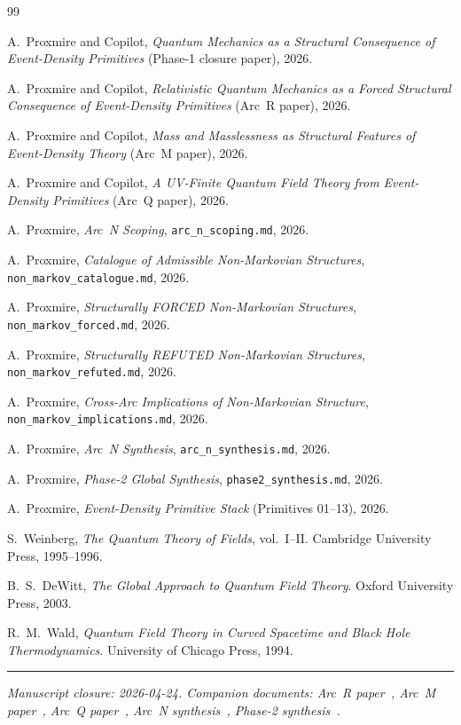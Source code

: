 \documentclass[11pt,a4paper]{article}
\begin{document}
\begin{thebibliography}{99}

A.~Proxmire and Copilot, \emph{Quantum Mechanics as a Structural Consequence of Event-Density Primitives} (Phase-1 closure paper), 2026.

A.~Proxmire and Copilot, \emph{Relativistic Quantum Mechanics as a Forced Structural Consequence of Event-Density Primitives} (Arc~R paper), 2026.

A.~Proxmire and Copilot, \emph{Mass and Masslessness as Structural Features of Event-Density Theory} (Arc~M paper), 2026.

A.~Proxmire and Copilot, \emph{A UV-Finite Quantum Field Theory from Event-Density Primitives} (Arc~Q paper), 2026.

A.~Proxmire, \emph{Arc~N Scoping}, \texttt{arc\_n\_scoping.md}, 2026.

A.~Proxmire, \emph{Catalogue of Admissible Non-Markovian Structures}, \texttt{non\_markov\_catalogue.md}, 2026.

A.~Proxmire, \emph{Structurally FORCED Non-Markovian Structures}, \texttt{non\_markov\_forced.md}, 2026.

A.~Proxmire, \emph{Structurally REFUTED Non-Markovian Structures}, \texttt{non\_markov\_refuted.md}, 2026.

A.~Proxmire, \emph{Cross-Arc Implications of Non-Markovian Structure}, \texttt{non\_markov\_implications.md}, 2026.

A.~Proxmire, \emph{Arc~N Synthesis}, \texttt{arc\_n\_synthesis.md}, 2026.

A.~Proxmire, \emph{Phase-2 Global Synthesis}, \texttt{phase2\_synthesis.md}, 2026.

A.~Proxmire, \emph{Event-Density Primitive Stack} (Primitives 01--13), 2026.

S.~Weinberg, \emph{The Quantum Theory of Fields}, vol.~I--II. Cambridge University Press, 1995--1996.

B.~S.~DeWitt, \emph{The Global Approach to Quantum Field Theory}. Oxford University Press, 2003.

R.~M.~Wald, \emph{Quantum Field Theory in Curved Spacetime and Black Hole Thermodynamics}. University of Chicago Press, 1994.

\end{thebibliography}

\vspace{1em}
\noindent\rule{\linewidth}{0.4pt}
\vspace{0.2em}

\noindent\emph{Manuscript closure: 2026-04-24. Companion documents: Arc~R paper~\cite{arcr}, Arc~M paper~\cite{arcm}, Arc~Q paper~\cite{arcq}, Arc~N synthesis~\cite{n5}, Phase-2 synthesis~\cite{p2syn}.}
\end{document}
